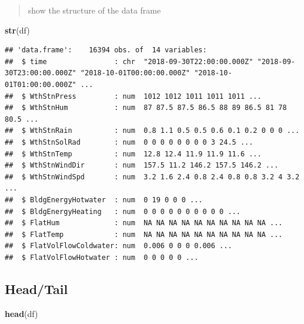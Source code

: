 \documentclass[
]{book}
\newenvironment{Shaded}{\begin{snugshade}}{\end{snugshade}}
\newcommand{\KeywordTok}[1]{\textcolor[rgb]{0.13,0.29,0.53}{\textbf{#1}}}
\newcommand{\NormalTok}[1]{#1}
\begin{document}
\begin{quote}
show the structure of the data frame
\end{quote}

\begin{Shaded}
\begin{Highlighting}[]
\KeywordTok{str}\NormalTok{(df)}
\end{Highlighting}
\end{Shaded}

\begin{verbatim}
## 'data.frame':    16394 obs. of  14 variables:
##  $ time                : chr  "2018-09-30T22:00:00.000Z" "2018-09-30T23:00:00.000Z" "2018-10-01T00:00:00.000Z" "2018-10-01T01:00:00.000Z" ...
##  $ WthStnPress         : num  1012 1012 1011 1011 1011 ...
##  $ WthStnHum           : num  87 87.5 87.5 86.5 88 89 86.5 81 78 80.5 ...
##  $ WthStnRain          : num  0.8 1.1 0.5 0.5 0.6 0.1 0.2 0 0 0 ...
##  $ WthStnSolRad        : num  0 0 0 0 0 0 0 0 3 24.5 ...
##  $ WthStnTemp          : num  12.8 12.4 11.9 11.9 11.6 ...
##  $ WthStnWindDir       : num  157.5 11.2 146.2 157.5 146.2 ...
##  $ WthStnWindSpd       : num  3.2 1.6 2.4 0.8 2.4 0.8 0.8 3.2 4 3.2 ...
##  $ BldgEnergyHotwater  : num  0 19 0 0 0 ...
##  $ BldgEnergyHeating   : num  0 0 0 0 0 0 0 0 0 0 ...
##  $ FlatHum             : num  NA NA NA NA NA NA NA NA NA NA ...
##  $ FlatTemp            : num  NA NA NA NA NA NA NA NA NA NA ...
##  $ FlatVolFlowColdwater: num  0.006 0 0 0 0.006 ...
##  $ FlatVolFlowHotwater : num  0 0 0 0 0 ...
\end{verbatim}

\hypertarget{headtail}{%
\subsection{Head/Tail}\label{headtail}}

\begin{Shaded}
\begin{Highlighting}[]
\KeywordTok{head}\NormalTok{(df)}
\end{Highlighting}
\end{Shaded}
\end{document}
